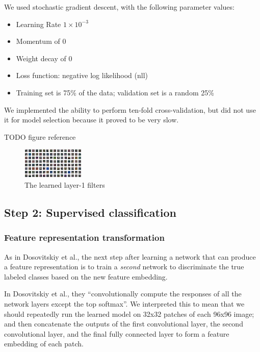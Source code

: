 \documentclass{article} %
\newenvironment{itemizedense}{
\begin{itemize}
  \setlength{\itemsep}{1pt}
  \setlength{\parskip}{0pt}
  \setlength{\parsep}{0pt}
}{\end{itemize}}
\begin{document}
We used stochastic gradient descent, with the following parameter values:

\begin{itemizedense}
\item Learning Rate $1 \times 10^{-3}$
\item Momentum of $0$
\item Weight decay of $0$
\item Loss function: negative log likelihood (nll)
\item Training set is 75\% of the data; validation set is a random 25\%
\end{itemizedense}

We implemented the ability to perform ten-fold cross-validation, but did not use it for model selection because it proved to be very slow.

TODO figure reference
\begin{figure}[h]
\centering
\includegraphics[width=\textwidth]{figs/filter_sur.png}
\caption{The learned layer-1 filters}
\end{figure}


\subsection{Step 2: Supervised classification}

\subsubsection{Feature representation transformation}

As in Dosovitskiy et al., the next step after learning a network that can produce a feature representation is to train a \emph{second} network to discriminate the true labeled classes based on the new feature embedding.

In Dosovitskiy et al., they ``convolutionally compute the responses of all the network layers except the top softmax''. We interpreted this to mean that we should repeatedly run the learned model on 32x32 patches of each 96x96 image; and then concatenate the outputs of the first convolutional layer, the second convolutional layer, and the final fully connected layer to form a feature embedding of each patch. 
\end{document}
